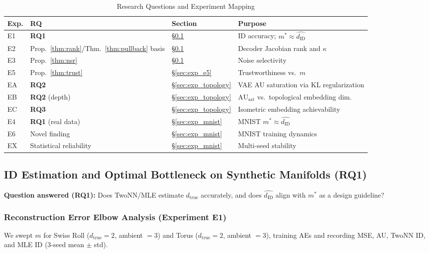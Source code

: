 \documentclass[12pt,a4paper]{article}
\newcommand{\dID}{d_{\mathrm{ID}}}
\newcommand{\dtrue}{d_{\mathrm{true}}}
\newcommand{\kap}{\kappa}
\newcommand{\AUsat}{\mathrm{AU}_{\mathrm{sat}}}
\begin{document}
\begin{table}[H]
\centering
\caption{Research Questions and Experiment Mapping}
\label{tab:rq_exp_map}
\begin{tabular}{lllp{4cm}}
\toprule
Exp. & RQ & Section & Purpose \\
\midrule
E1 & \textbf{RQ1} & \S\ref{sec:exp_synthetic} & ID accuracy; $m^* \approx \hat{\dID}$ \\
E2 & Prop.~\ref{thm:rank}/Thm.~\ref{thm:pullback} basis & \S\ref{sec:exp_synthetic} & Decoder Jacobian rank and $\kap$ \\
E3 & Prop.~\ref{thm:nsr} & \S\ref{sec:exp_synthetic} & Noise selectivity \\
E5 & Prop.~\ref{thm:trust} & \S\ref{sec:exp_e5} & Trustworthiness vs.\ $m$ \\
EA & \textbf{RQ2} & \S\ref{sec:exp_topology} & VAE AU saturation via KL regularization \\
EB & \textbf{RQ2} (depth) & \S\ref{sec:exp_topology} & $\AUsat$ vs.\ topological embedding dim. \\
EC & \textbf{RQ3} & \S\ref{sec:exp_topology} & Isometric embedding achievability \\
E4 & \textbf{RQ1} (real data) & \S\ref{sec:exp_mnist} & MNIST $m^* \approx \hat{\dID}$ \\
E6 & Novel finding & \S\ref{sec:exp_mnist} & MNIST training dynamics \\
EX & Statistical reliability & \S\ref{sec:exp_mnist} & Multi-seed stability \\
\bottomrule
\end{tabular}
\end{table}

\subsection{ID Estimation and Optimal Bottleneck on Synthetic Manifolds (RQ1)}\label{sec:exp_synthetic}

\textbf{Question answered (RQ1):} Does TwoNN/MLE estimate $\dtrue$ accurately, and does $\hat{\dID}$ align with $m^*$ as a design guideline?

\subsubsection{Reconstruction Error Elbow Analysis (Experiment E1)}

We swept $m$ for Swiss Roll ($\dtrue = 2$, ambient $= 3$) and Torus ($\dtrue = 2$, ambient $= 3$), training AEs and recording MSE, AU, TwoNN ID, and MLE ID (3-seed mean $\pm$ std).
\end{document}
